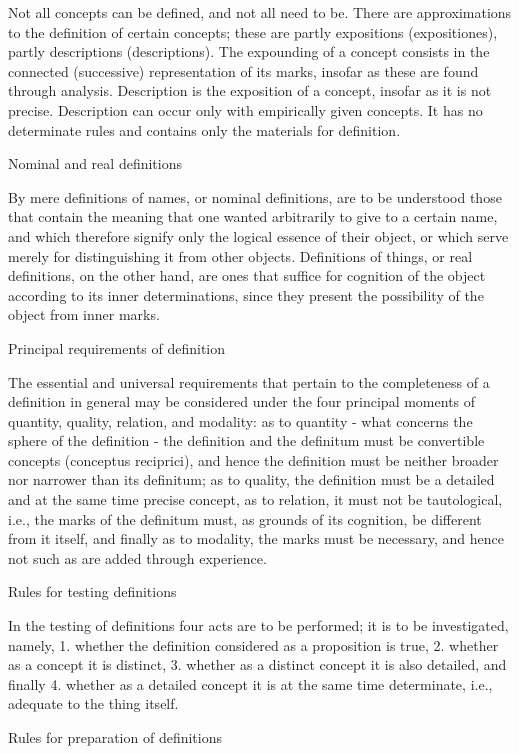 Not all concepts can be defined, and not all need to be.
There are approximations to the definition of certain concepts;
these are partly expositions (expositiones),
partly descriptions (descriptions).
The expounding of a concept consists in
the connected (successive) representation of its marks,
insofar as these are found through analysis.
Description is the exposition of a concept,
insofar as it is not precise.
Description can occur only with
 empirically given concepts.
It has no determinate rules
and contains only the materials for definition.

Nominal and real definitions

By mere definitions of names, or nominal definitions,
are to be understood those that contain the meaning
that one wanted arbitrarily to give to a certain name,
and which therefore signify only the logical essence of their object,
or which serve merely for distinguishing it from other objects.
Definitions of things, or real definitions,
on the other hand, are ones that suffice for cognition of
the object according to its inner determinations,
since they present the possibility of the object from inner marks.

Principal requirements of definition

The essential and universal requirements
that pertain to the completeness of a definition in general
may be considered under the four principal moments of
quantity, quality, relation, and modality:
as to quantity - what concerns the sphere of the definition -
the definition and the definitum must be
convertible concepts (conceptus reciprici),
and hence the definition must be
 neither broader nor narrower than its definitum;
as to quality, the definition must be a
detailed and at the same time precise concept,
as to relation, it must not be tautological,
i.e., the marks of the definitum must,
as grounds of its cognition,
be different from it itself,
and finally as to modality,
the marks must be necessary,
and hence not such as are
added through experience.

Rules for testing definitions

In the testing of definitions four acts are to be performed;
it is to be investigated, namely,
1.  whether the definition considered as a proposition is true,
2.  whether as a concept it is distinct,
3.  whether as a distinct concept it is also detailed, and finally
4.  whether as a detailed concept it is at the same time determinate,
    i.e., adequate to the thing itself.

Rules for preparation of definitions

